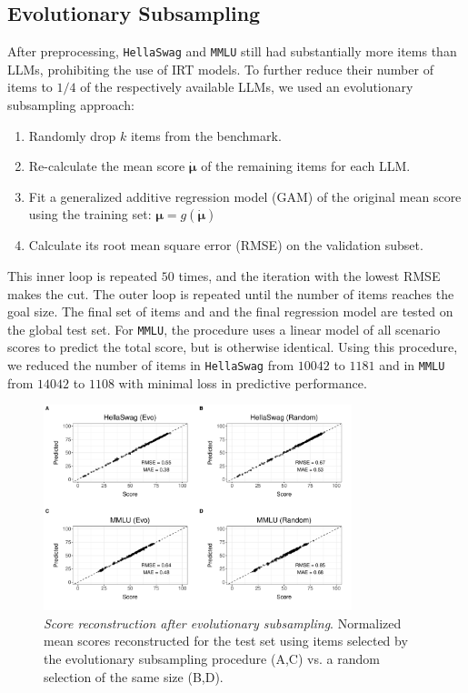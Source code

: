 \documentclass{article}
\begin{document}
\subsection{Evolutionary Subsampling}
After preprocessing, \texttt{HellaSwag} and \texttt{MMLU} still had substantially more items than LLMs, prohibiting the use of IRT models. To further reduce their number of items to $1/4$ of the respectively available LLMs, we used an evolutionary subsampling approach:
\begin{enumerate}
   \item Randomly drop $k$ items from the benchmark.
   \item Re-calculate the mean score $\dot {\boldsymbol{\mu}}$ of the remaining items for each LLM.
   \item Fit a generalized additive regression model (GAM) of the original mean score using the training set: $\boldsymbol\mu = g(\dot{\boldsymbol\mu})$ 
   \item Calculate its root mean square error (RMSE) on the validation subset.
\end{enumerate}
This inner loop is repeated $50$ times, and the iteration with the lowest RMSE makes the cut. The outer loop is repeated until the number of items reaches the goal size. The final set of items and and the final regression model are tested on the global test set. For \texttt{MMLU}, the procedure uses a linear model of all scenario scores to predict the total score, but is otherwise identical.
Using this procedure, we reduced the number of items in \texttt{HellaSwag} from $10042$ to $1181$ and in \texttt{MMLU} from $14042$ to $1108$ with minimal loss in predictive performance.
\begin{figure}[]
   \centering
   \includegraphics[width=0.8\textwidth]{figures/evo.pdf}
   \caption{\textit{Score reconstruction after evolutionary subsampling}. Normalized mean scores reconstructed for the test set using items selected by the evolutionary subsampling procedure (A,C) vs. a random selection of the same size (B,D).}
   \label{fig:hs-reduced}
\end{figure}
\end{document}
